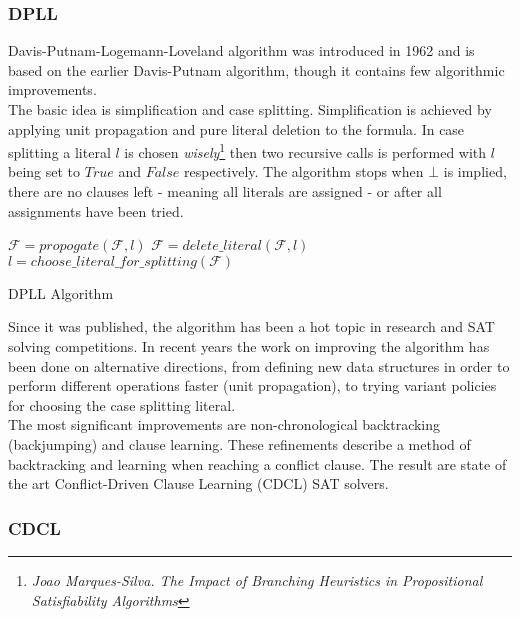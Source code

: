 \documentclass[]{article}
\begin{document}
	\subsubsection{DPLL}
	Davis-Putnam-Logemann-Loveland algorithm was introduced in 1962 and is based on the earlier Davis-Putnam algorithm, though it contains few algorithmic improvements. \\
	The basic idea is simplification and case splitting. Simplification is achieved by applying unit propagation and pure literal deletion to the formula. In case splitting a literal $ l $ is chosen \textit{wisely}\footnote{\textit{Joao Marques-Silva. The Impact of Branching Heuristics in Propositional Satisfiability Algorithms} } then two recursive calls is performed with $ l $ being set to $ True $ and $ False $ respectively. The algorithm stops when $ \bot $ is implied, there are no clauses left - meaning all literals are assigned - or after all assignments have been tried.
	\\
	\begin{algorithm}[H]
		 {
			$ \mathcal{F} = propogate(\mathcal{F}, l) $
		}
		 {
			$ \mathcal{F} = delete\_literal(\mathcal{F}, l) $
		}
		$ l = choose\_literal\_for\_splitting(\mathcal{F}) $ \\
	\caption{DPLL Algorithm}
	\end{algorithm}
	Since it was published, the algorithm has been a hot topic in research and SAT solving competitions. In recent years the work on improving the algorithm has been done on alternative directions, from defining new data structures in order to perform different operations faster (unit propagation), to trying variant policies for choosing the case splitting literal.\\ The most significant improvements are non-chronological backtracking (backjumping) and clause learning. These refinements describe a method of backtracking and learning when reaching a conflict clause. The result are state of the art Conflict-Driven Clause Learning (CDCL) SAT solvers.

	\subsubsection{CDCL}
\end{document}
